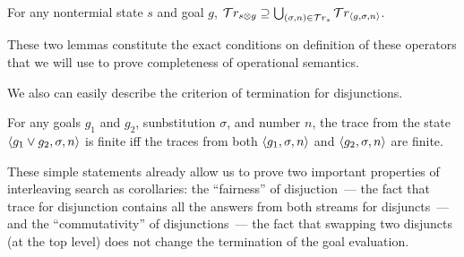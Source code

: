 \begin{lemma}
\label{lem:prod_answers}
For any nontermial state $s$ and goal $g$,  \mbox{$\mathcal{T}r_{s \otimes g} \supseteq \bigcup_{(\sigma, n) \in \mathcal{T}r_{s}} \mathcal{T}r_{\left<{g, \sigma, n}\right>}$}.
\end{lemma}

These two lemmas constitute the exact conditions on definition of these operators that we will use to prove completeness of operational semantics.

We also can easily describe the criterion of termination for disjunctions.

\begin{lemma}
\label{lem:disj_termination}
For any goals $g_1$ and $g_2$, sunbstitution $\sigma$, and number $n$, the trace from the state $\left<{g_1 \vee g_2, \sigma, n}\right>$ is finite iff the traces from both $\left<{g_1, \sigma, n}\right>$ and $\left<{g_2, \sigma, n}\right>$ are finite.
\end{lemma}

These simple statements already allow us to prove two important properties of interleaving search as corollaries: the ``fairness'' of disjuction~--- the fact that trace for disjunction contains all the answers from both streams for disjuncts~--- and the ``commutativity'' of disjunctions~--- the fact that swapping two disjuncts (at the top level) does not change the termination of the goal evaluation. 
